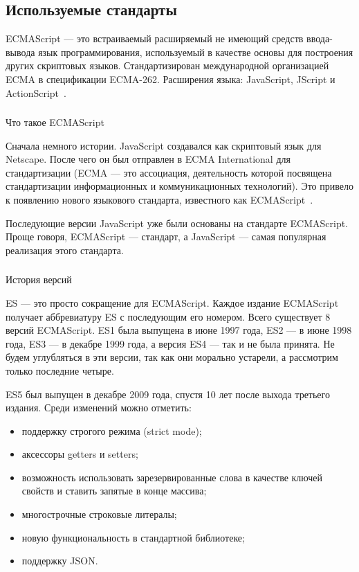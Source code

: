 \subsection{Используемые стандарты}
\label{sec:modeling:ecma}

ECMAScript — это встраиваемый расширяемый не имеющий средств ввода-вывода язык программирования, используемый в качестве основы для построения других скриптовых языков. Стандартизирован международной организацией ECMA в спецификации ECMA-262. Расширения языка: JavaScript, JScript и ActionScript~\cite{wiki_ecma}.

\subsubsection{}Что такое ECMAScript
\

Сначала немного истории. JavaScript создавался как скриптовый язык для Netscape. После чего он был отправлен в ECMA International для стандартизации (ECMA — это ассоциация, деятельность которой посвящена стандартизации информационных и коммуникационных технологий). Это привело к появлению нового языкового стандарта, известного как ECMAScript~\cite{ecma_additional}.

Последующие версии JavaScript уже были основаны на стандарте ECMAScript. Проще говоря, ECMAScript — стандарт, а JavaScript — самая популярная реализация этого стандарта.

\subsubsection{}История версий
\

ES — это просто сокращение для ECMAScript. Каждое издание ECMAScript получает аббревиатуру ES с последующим его номером. Всего существует 8 версий ECMAScript. ES1 была выпущена в июне 1997 года, ES2 — в июне 1998 года, ES3 — в декабре 1999 года, а версия ES4 — так и не была принята. Не будем углубляться в эти версии, так как они морально устарели, а рассмотрим только последние четыре.

ES5 был выпущен в декабре 2009 года, спустя 10 лет после выхода третьего издания. Среди изменений можно отметить:

\begin{itemize}
    \item поддержку строгого режима (strict mode);
    \item аксессоры getters и setters;
    \item возможность использовать зарезервированные слова в качестве ключей свойств и ставить запятые в конце массива;
    \item многострочные строковые литералы;
    \item новую функциональность в стандартной библиотеке;
    \item поддержку JSON.
\end{itemize}

